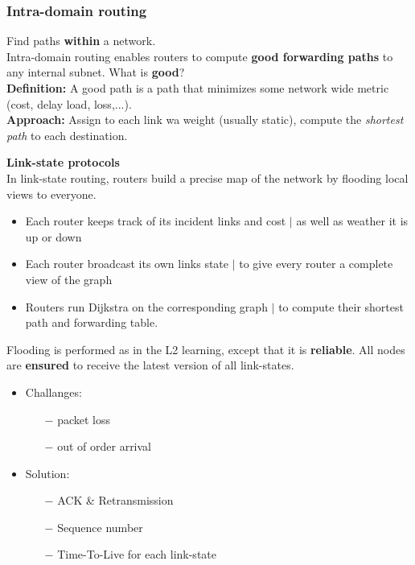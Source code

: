 \documentclass[a4paper, fontsize=8pt, landscape, DIV=1]{scrartcl}
\begin{document}
\begin{multicols*}{4}
   		\subsubsection{Intra-domain routing}
   		Find paths \textbf{within} a network.\\
   		Intra-domain routing enables routers to compute \textbf{good forwarding paths} to any internal subnet. What is \textbf{good}?\\
   		\textbf{Definition:} A good path is a path that minimizes some network wide metric (cost, delay load, loss,...).\\
   		\textbf{Approach:} Assign to each link wa weight (usually static), compute the \textit{shortest path} to each destination.\par
   		
   		\textbf{Link-state protocols}\\
   		 In link-state routing, routers build a precise map of the network by flooding local views to everyone. 
   		 \begin{itemize}[noitemsep]
   		 	\item Each router keeps track of its incident links and cost $\vert$ as well as weather it is up or down
   		 	\item Each router broadcast its own links state $\vert$ to give every router a complete view of the graph
   		 	\item Routers run Dijkstra on the corresponding graph $\vert$ to compute their shortest path and forwarding table. 
   		 \end{itemize}
   	 	Flooding is performed as in the L2 learning, except that it is \textbf{reliable}. All nodes are \textbf{ensured} to receive the latest version of all link-states.\\
   	 	\begin{itemize}[noitemsep]
   	 		\item Challanges: 
   	 		\begin{itemize}
   	 			\item[$-$] packet loss
   	 			\item[$-$] out of order arrival
   	 		\end{itemize}
    		\item Solution:
    		\begin{itemize}
    			\item[$-$] ACK \& Retransmission
    			\item[$-$] Sequence number
    			\item[$-$] Time-To-Live for each link-state

\end{itemize}
\end{itemize}
\end{multicols*}
\end{document}
